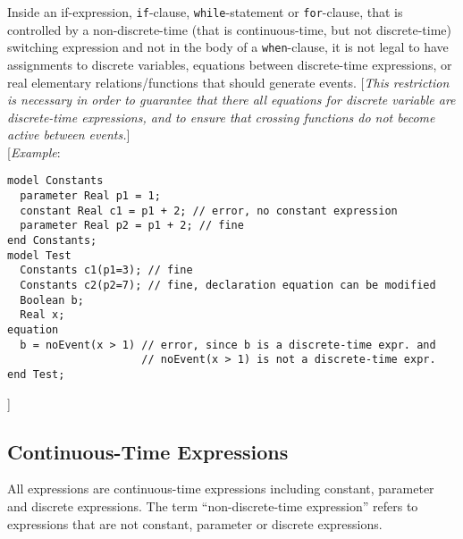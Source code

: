 Inside an if-expression, \lstinline[basicstyle=\ttfamily]!if!-clause, \lstinline[basicstyle=\ttfamily]!while!-statement or \lstinline[basicstyle=\ttfamily]!for!-clause, that
is controlled by a non-discrete-time (that is continuous-time, but not
discrete-time) switching expression and not in the body of a
\lstinline[basicstyle=\ttfamily]!when!-clause, it is not legal to have assignments to discrete variables,
equations between discrete-time expressions, or real elementary
relations/functions that should generate events. {[}\emph{This
restriction is necessary in order to guarantee that there all equations
for discrete variable are discrete-time expressions, and to ensure that
crossing functions do not become active between events.}{]}\\

{[}\emph{Example}:
\begin{lstlisting}[language=modelica]
model Constants
  parameter Real p1 = 1;
  constant Real c1 = p1 + 2; // error, no constant expression
  parameter Real p2 = p1 + 2; // fine
end Constants;
model Test
  Constants c1(p1=3); // fine
  Constants c2(p2=7); // fine, declaration equation can be modified
  Boolean b;
  Real x;
equation
  b = noEvent(x > 1) // error, since b is a discrete-time expr. and
                     // noEvent(x > 1) is not a discrete-time expr.
end Test;
\end{lstlisting}

{]}

\subsection{Continuous-Time Expressions}

All expressions are continuous-time expressions including constant,
parameter and discrete expressions. The term ``non-discrete-time
expression'' refers to expressions that are not constant, parameter or
discrete expressions.
